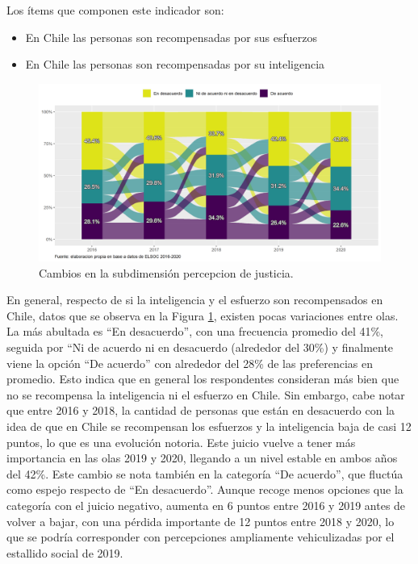 \documentclass[
  12pt,
]{book}
\begin{document}
Los ítems que componen este indicador son:

\begin{itemize}
\item
  En Chile las personas son recompensadas por sus esfuerzos
\item
  En Chile las personas son recompensadas por su inteligencia
\end{itemize}

\begin{figure}[H]

{\centering \includegraphics[width=1\linewidth,height=1\textheight]{output/graphs/alluvial_justicia} 

}

\caption{Cambios en la subdimensión percepcion de justicia.}\label{fig:alluvial-justicia}
\end{figure}

En general, respecto de si la inteligencia y el esfuerzo son recompensados en Chile, datos que se observa en la Figura \ref{fig:alluvial-justicia}, existen pocas variaciones entre olas. La más abultada es ``En desacuerdo'', con una frecuencia promedio del 41\%, seguida por ``Ni de acuerdo ni en desacuerdo (alrededor del 30\%) y finalmente viene la opción ``De acuerdo'' con alrededor del 28\% de las preferencias en promedio. Esto indica que en general los respondentes consideran más bien que no se recompensa la inteligencia ni el esfuerzo en Chile. Sin embargo, cabe notar que entre 2016 y 2018, la cantidad de personas que están en desacuerdo con la idea de que en Chile se recompensan los esfuerzos y la inteligencia baja de casi 12 puntos, lo que es una evolución notoria. Este juicio vuelve a tener más importancia en las olas 2019 y 2020, llegando a un nivel estable en ambos años del 42\%. Este cambio se nota también en la categoría ``De acuerdo'', que fluctúa como espejo respecto de ``En desacuerdo''. Aunque recoge menos opciones que la categoría con el juicio negativo, aumenta en 6 puntos entre 2016 y 2019 antes de volver a bajar, con una pérdida importante de 12 puntos entre 2018 y 2020, lo que se podría corresponder con percepciones ampliamente vehiculizadas por el estallido social de 2019.
\end{document}
